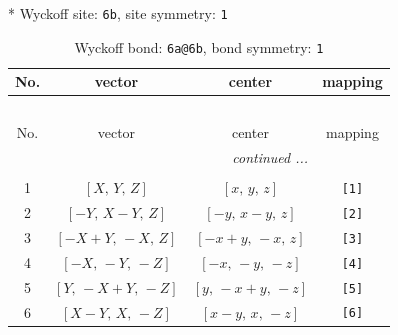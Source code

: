 \documentclass[fleqn,8pt]{jsarticle}
\begin{document}
* Wyckoff site: {\tt 6b}, site symmetry: {\tt 1}
\renewcommand{\arraystretch}{1.2}
\begin{longtable}{cccc}
\caption{Wyckoff bond: {\tt 6a@6b}, bond symmetry: {\tt 1}}
 \\
 \hline \hline
No. & vector & center & mapping \\ \hline \endfirsthead

\multicolumn{3}{l}{\tablename\ \thetable{}} \\
 \hline \hline
No. & vector & center & mapping \\ \hline \endhead

 \hline \hline
\multicolumn{3}{r}{\footnotesize\it continued ...} \\ \endfoot

 \hline \hline
\multicolumn{3}{r}{} \\ \endlastfoot

1 & $\left[ X,\, Y,\, Z \right]$ & $\left[ x,\, y,\, z \right]$ & {\tt [1]} \\ \hline
2 & $\left[ - Y,\, X - Y,\, Z \right]$ & $\left[ - y,\, x - y,\, z \right]$ & {\tt [2]} \\ \hline
3 & $\left[ - X + Y,\, - X,\, Z \right]$ & $\left[ - x + y,\, - x,\, z \right]$ & {\tt [3]} \\ \hline
4 & $\left[ - X,\, - Y,\, - Z \right]$ & $\left[ - x,\, - y,\, - z \right]$ & {\tt [4]} \\ \hline
5 & $\left[ Y,\, - X + Y,\, - Z \right]$ & $\left[ y,\, - x + y,\, - z \right]$ & {\tt [5]} \\ \hline
6 & $\left[ X - Y,\, X,\, - Z \right]$ & $\left[ x - y,\, x,\, - z \right]$ & {\tt [6]} \\
\end{longtable}
\end{document}
